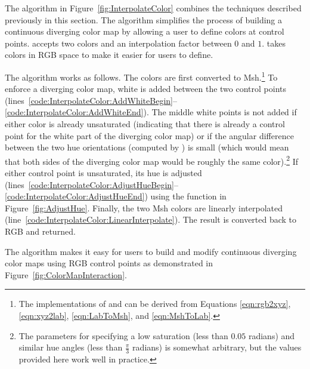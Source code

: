 \documentclass{acmsiggraph}               %
\newcommand{\RGB}{RGB\xspace}
\newcommand{\Msh}{Msh\xspace}
\begin{document}
The  algorithm in Figure~\ref{fig:InterpolateColor}
combines the techniques described previously in this section.  The
algorithm simplifies the process of building a continuous diverging color
map by allowing a user to define colors at control points.
 accepts two colors and an interpolation factor
between $0$ and $1$.   takes colors in \RGB space to
make it easier for users to define.

The  algorithm works as follows.  The colors are
first converted to \Msh.\footnote{The implementations of  and
 can be derived from Equations \ref{eqn:rgb2xyz},
\ref{eqn:xyz2lab}, \ref{eqn:LabToMsh}, and \ref{eqn:MshToLab}.}  To enforce
a diverging color map, white is added between the two control points
(lines~\ref{code:InterpolateColor:AddWhiteBegin}--\ref{code:InterpolateColor:AddWhiteEnd}).
The middle white points is not added if either color is already unsaturated
(indicating that there is already a control point for the white part of the
diverging color map) or if the angular difference between the two hue
orientations (computed by ) is small (which would mean that
both sides of the diverging color map would be roughly the same
color).\footnote{The parameters for specifying a low saturation (less than
$0.05$ radians) and similar hue angles (less than $\frac{\pi}{3}$ radians)
is somewhat arbitrary, but the values provided here work well in practice.}
If either control point is unsaturated, its hue is adjusted
(lines~\ref{code:InterpolateColor:AdjustHueBegin}--\ref{code:InterpolateColor:AdjustHueEnd})
using the  function in Figure~\ref{fig:AdjustHue}.
Finally, the two \Msh colors are linearly interpolated
(line~\ref{code:InterpolateColor:LinearInterpolate}).  The result is
converted back to \RGB and returned.

The  algorithm makes it easy for users to build and
modify continuous diverging color maps using \RGB control points as
demonstrated in Figure~\ref{fig:ColorMapInteraction}.
\end{document}
